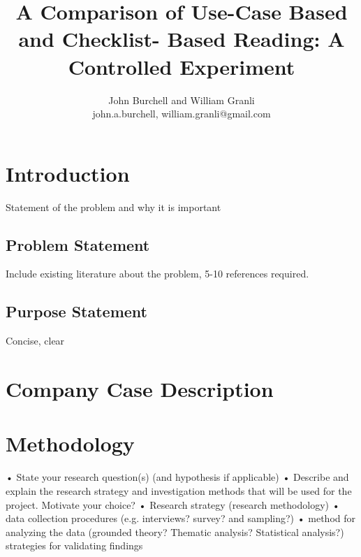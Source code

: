 \documentclass[10pt,twocolumn]{article}
\begin{document}
\title{A Comparison of Use-Case Based and Checklist-
Based Reading: A Controlled Experiment}

\author{John Burchell and William Granli \\
john.a.burchell, william.granli@gmail.com}


\maketitle
\thispagestyle{empty}


\section{Introduction}
Statement of the problem and why it	is important

\subsection*{Problem Statement}
Include existing literature about the problem, 5-10 references required.

\subsection*{Purpose Statement}
Concise, clear

\section{Company Case Description}

\section{Methodology}
• State	your	research	question(s)	(and	hypothesis	if	applicable)
• Describe	and	explain	the	research	strategy	and	investigation	methods that	will	be	used	for	the	project.	Motivate	your	choice?
• Research	strategy	(research	methodology)
• data	collection	procedures	(e.g.	interviews?	survey?	and	sampling?)	
• method	for	analyzing	the	data	(grounded	theory?	Thematic	analysis?	
Statistical	analysis?)	strategies	for	validating	findings






\noindent
\end{document}
